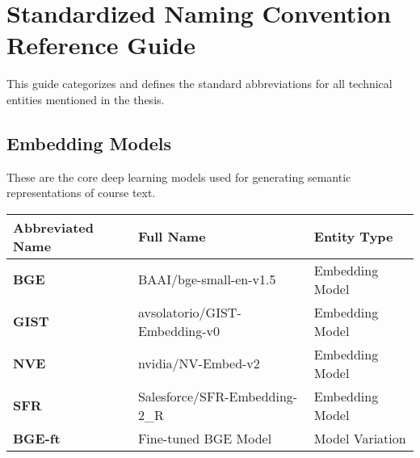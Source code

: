 \documentclass[11pt]{article}
\begin{document}
\newpage

\section*{Standardized Naming Convention Reference Guide}
This guide categorizes and defines the standard abbreviations for all technical entities mentioned in the thesis.

\subsection*{Embedding Models}
These are the core deep learning models used for generating semantic representations of course text.
\begin{table}[h!]
\centering
\begin{tabular}{@{}lll@{}}
\toprule
\textbf{Abbreviated Name} & \textbf{Full Name}                 & \textbf{Entity Type} \\ \midrule
\textbf{BGE}              & BAAI/bge-small-en-v1.5           & Embedding Model      \\
\textbf{GIST}             & avsolatorio/GIST-Embedding-v0      & Embedding Model      \\
\textbf{NVE}              & nvidia/NV-Embed-v2                 & Embedding Model      \\
\textbf{SFR}              & Salesforce/SFR-Embedding-2\_R      & Embedding Model      \\
\textbf{BGE-ft}           & Fine-tuned BGE Model               & Model Variation      \\ \bottomrule
\end{tabular}
\end{table}
\end{document}
